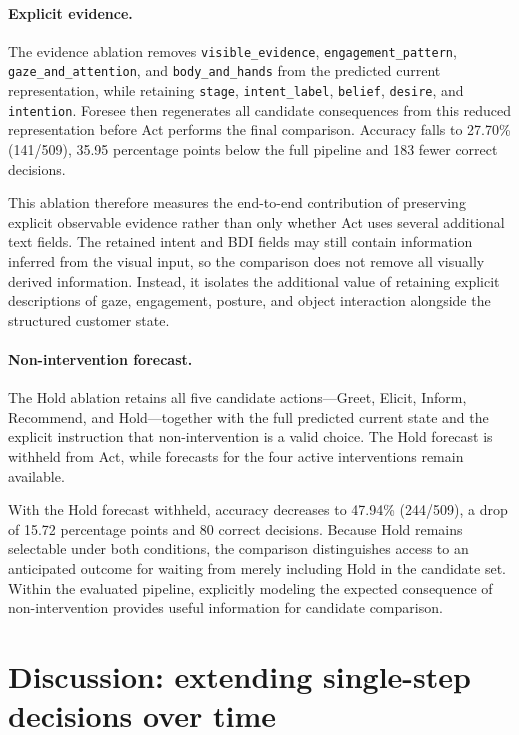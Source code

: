 \documentclass{article}
\begin{document}
\paragraph{Explicit evidence.}
The evidence ablation removes
\texttt{visible\_evidence},
\texttt{engagement\_pattern},
\texttt{gaze\_and\_attention}, and
\texttt{body\_and\_hands} from the predicted current representation,
while retaining \texttt{stage}, \texttt{intent\_label},
\texttt{belief}, \texttt{desire}, and \texttt{intention}.
Foresee then regenerates all candidate consequences from this reduced
representation before Act performs the final comparison. Accuracy falls
to 27.70\% (141/509), 35.95 percentage points below the full pipeline
and 183 fewer correct decisions.

This ablation therefore measures the end-to-end contribution of
preserving explicit observable evidence rather than only whether Act
uses several additional text fields. The retained intent and BDI fields
may still contain information inferred from the visual input, so the
comparison does not remove all visually derived information. Instead,
it isolates the additional value of retaining explicit descriptions of
gaze, engagement, posture, and object interaction alongside the
structured customer state.

\paragraph{Non-intervention forecast.}
The Hold ablation retains all five candidate actions---Greet, Elicit,
Inform, Recommend, and Hold---together with the full predicted current
state and the explicit instruction that non-intervention is a valid
choice. The Hold forecast is withheld from Act, while forecasts for
the four active interventions remain available.

With the Hold forecast withheld, accuracy decreases to 47.94\%
(244/509), a drop of 15.72 percentage points and 80 correct decisions.
Because Hold remains selectable under both conditions, the comparison
distinguishes access to an anticipated outcome for waiting from merely
including Hold in the candidate set. Within the evaluated pipeline,
explicitly modeling the expected consequence of non-intervention
provides useful information for candidate comparison.


\section{Discussion: extending single-step decisions over
time}\label{discussion-extending-single-step-decisions-over-time}
\end{document}
